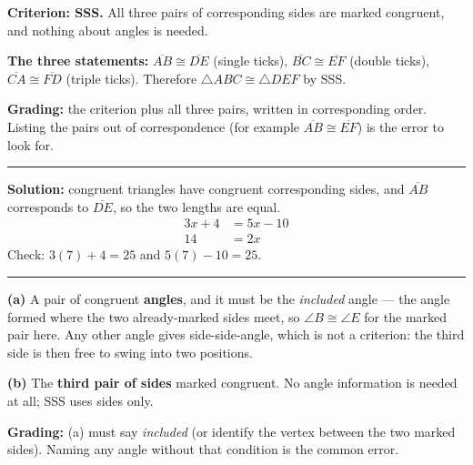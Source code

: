 \documentclass[12pt]{article}
\begin{document}



\textbf{Criterion: SSS.} All three pairs of corresponding sides are marked congruent, and nothing about angles is needed.

\textbf{The three statements:} $\overline{AB} \cong \overline{DE}$ (single ticks), $\overline{BC} \cong \overline{EF}$ (double ticks), $\overline{CA} \cong \overline{FD}$ (triple ticks). Therefore $\triangle ABC \cong \triangle DEF$ by SSS.

\textbf{Grading:} the criterion plus all three pairs, written in corresponding order. Listing the pairs out of correspondence (for example $\overline{AB} \cong \overline{EF}$) is the error to look for.

\vspace{0.2cm}\noindent\rule{\linewidth}{0.2pt}


\textbf{Solution:} congruent triangles have congruent corresponding sides, and $\overline{AB}$ corresponds to $\overline{DE}$, so the two lengths are equal.
\begin{align*}
  3x + 4 &= 5x - 10 \\
  14 &= 2x
\end{align*}
Check: $3(7) + 4 = 25$ and $5(7) - 10 = 25$. 

\vspace{0.2cm}\noindent\rule{\linewidth}{0.2pt}


\textbf{(a)} A pair of congruent \textbf{angles}, and it must be the \emph{included} angle --- the angle formed where the two already-marked sides meet, so $\angle B \cong \angle E$ for the marked pair here. Any other angle gives side-side-angle, which is not a criterion: the third side is then free to swing into two positions.

\textbf{(b)} The \textbf{third pair of sides} marked congruent. No angle information is needed at all; SSS uses sides only.

\textbf{Grading:} (a) must say \emph{included} (or identify the vertex between the two marked sides). Naming any angle without that condition is the common error.
\end{document}
